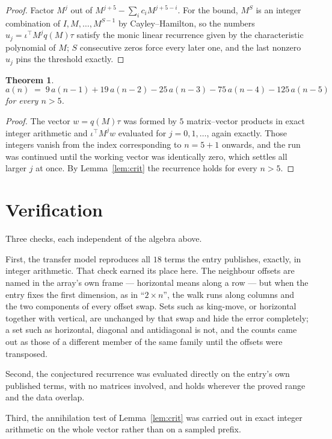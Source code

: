 \documentclass[11pt,a4paper]{article}
\theoremstyle{plain}
\newtheorem{theorem}{Theorem}
\theoremstyle{definition}
\begin{document}
\begin{proof}
Factor $M^{j}$ out of $M^{j+5}-\sum_ic_iM^{j+5-i}$. For the bound, $M^{S}$
is an integer combination of $I,M,\dots,M^{S-1}$ by Cayley--Hamilton, so the numbers
$u_j=\iota^{\!\top}M^{j}q(M)\tau$ satisfy the monic linear recurrence given by the
characteristic polynomial of $M$; $S$ consecutive zeros force every later one, and the last
nonzero $u_j$ pins the threshold exactly.
\end{proof}

\begin{theorem}
\[
a(n)\;=\;9\,a(n-1) + 19\,a(n-2) - 25\,a(n-3) - 75\,a(n-4) - 125\,a(n-5)
\]
for every $n>5$.
\end{theorem}

\begin{proof}
The vector $w=q(M)\tau$ was formed by $5$ matrix--vector products in exact integer
arithmetic and $\iota^{\!\top}M^{j}w$ evaluated for $j=0,1,\dots$, again exactly. Those
integers vanish from the index corresponding to $n=5+1$ onwards, and the run was
continued until the working vector was identically zero, which settles all larger $j$ at once.
By Lemma~\ref{lem:crit} the recurrence holds for every $n>5$.
\end{proof}

\section{Verification}

Three checks, each independent of the algebra above.

First, the transfer model reproduces all $18$ terms the entry publishes, exactly, in
integer arithmetic. That check earned its place here. The neighbour offsets are named in the
array's own frame --- horizontal means along a row --- but when the entry fixes the first
dimension, as in ``$2\times n$'', the walk runs along columns and the two components of every
offset swap. Sets such as king-move, or horizontal together with vertical, are unchanged by
that swap and hide the error completely; a set such as horizontal, diagonal and antidiagonal
is not, and the counts came out as those of a different member of the same family until the
offsets were transposed.

Second, the conjectured recurrence was evaluated directly on the entry's own published terms,
with no matrices involved, and holds wherever the proved range and the data overlap.

Third, the annihilation test of Lemma~\ref{lem:crit} was carried out in exact integer
arithmetic on the whole vector rather than on a sampled prefix.
\end{document}
